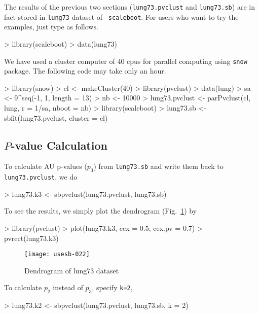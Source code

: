 \documentclass[a4paper]{amsart}
\begin{document}
The results of the previous two sections ({\tt lung73.pvclust} and
{\tt lung73.sb}) are in fact stored in {\tt lung73} dataset of {\tt
scaleboot}. For users who want to try the examples, just type as follows.
\begin{Schunk}
\begin{Sinput}
> library(scaleboot)
> data(lung73)
\end{Sinput}
\end{Schunk}

We have used a cluster computer of 40 cpus for parallel
computing using {\tt snow} package.
The following code may take only an hour.
\begin{Schunk}
\begin{Sinput}
> library(snow)
> cl <- makeCluster(40)
> library(pvclust)
> data(lung)
> sa <- 9^seq(-1, 1, length = 13)
> nb <- 10000
> lung73.pvclust <- parPvclust(cl, lung, r = 1/sa, nboot = nb)
> library(scaleboot)
> lung73.sb <- sbfit(lung73.pvclust, cluster = cl)
\end{Sinput}
\end{Schunk}

\subsection{$P$-value Calculation}

To calculate AU p-values ($p_3$) from {\tt lung73.sb} and write them
back to {\tt lung73.pvclust}, we do
\begin{Schunk}
\begin{Sinput}
> lung73.k3 <- sbpvclust(lung73.pvclust, lung73.sb)
\end{Sinput}
\end{Schunk}
To see the results, we simply plot the dendrogram
(Fig.~\ref{fig:lung73tree}) by
\begin{Schunk}
\begin{Sinput}
> library(pvclust)
> plot(lung73.k3, cex = 0.5, cex.pv = 0.7)
> pvrect(lung73.k3)
\end{Sinput}
\end{Schunk}
\begin{figure}
\begin{center}
\texttt{[image: usesb-022]}
\caption{Dendrogram of lung73 dataset}\label{fig:lung73tree}
\end{center}
\end{figure}
To calculate $p_2$ instead of $p_3$, specify {\tt k=2},
\begin{Schunk}
\begin{Sinput}
> lung73.k2 <- sbpvclust(lung73.pvclust, lung73.sb, k = 2)
\end{Sinput}
\end{Schunk}
\end{document}
